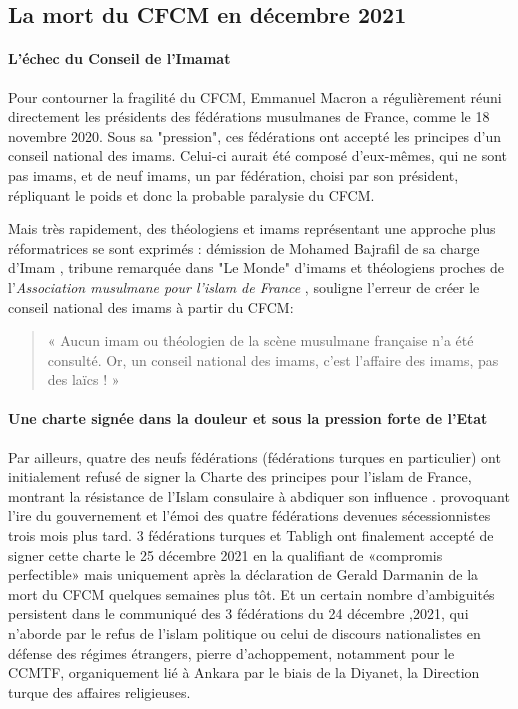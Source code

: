 \subsection*{La mort du CFCM en décembre 2021}

\paragraph{L'échec du Conseil de l'Imamat}
Pour contourner la fragilité du CFCM, Emmanuel Macron a régulièrement réuni directement les présidents des fédérations musulmanes de France, comme le 18 novembre 2020. Sous sa "pression", ces fédérations ont accepté les principes d’un conseil national des imams. Celui-ci aurait été composé d’eux-mêmes, qui ne sont pas imams, et de neuf imams, un par fédération, choisi par son président, répliquant le poids et donc la probable paralysie du CFCM.

Mais très rapidement, des théologiens et imams représentant une approche plus  réformatrices se sont exprimés :  démission de Mohamed Bajrafil de sa charge d'Imam , tribune remarquée dans "Le Monde" d'imams et théologiens proches de l'\textit{Association musulmane pour l’islam de France} , souligne l'erreur de créer le  conseil national des imams à partir du CFCM: 
\begin{quote}
    « Aucun imam ou théologien de la scène musulmane française n’a été consulté. Or, un conseil national des imams, c’est l’affaire des imams, pas des laïcs ! »
\end{quote}

\paragraph{Une charte signée dans la douleur et sous la pression forte de l'Etat}
Par ailleurs, quatre des neufs fédérations (fédérations turques en particulier) ont initialement refusé de signer la Charte des principes pour l’islam de France, montrant la résistance de l'Islam consulaire à abdiquer son influence . provoquant l’ire du gouvernement et l’émoi des quatre fédérations devenues sécessionnistes trois mois plus tard.
3 fédérations turques et Tabligh ont finalement accepté de signer cette charte le 25 décembre 2021 en la qualifiant  de «compromis perfectible» mais uniquement après la déclaration de Gerald Darmanin de la mort du CFCM quelques semaines plus tôt. Et un certain nombre d'ambiguités persistent dans le communiqué des 3 fédérations du 24 décembre ,2021, qui n'aborde par  le refus de l’islam politique ou celui de discours nationalistes en défense des régimes étrangers, pierre d’achoppement, notamment pour le CCMTF, organiquement lié à Ankara par le biais de la Diyanet, la Direction turque des affaires religieuses.

